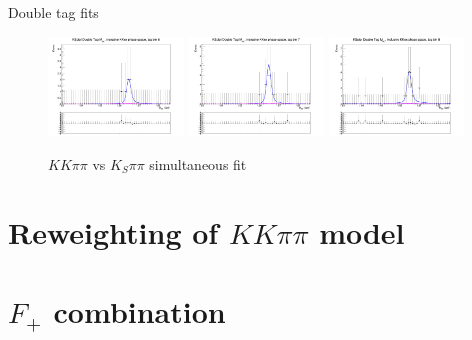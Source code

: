 \documentclass{beamer}
\begin{document}
\begin{frame}{Double tag fits}
\begin{figure}
    \includegraphics[width=0.32\textwidth, clip = true, trim = {0 11cm 0 0}]{Plots/DoubleTagYield_DoubleTag_SCMB_KKpipi_vs_KSpipi_SignalBin0_TagBin6.png}
    \includegraphics[width=0.32\textwidth, clip = true, trim = {0 11cm 0 0}]{Plots/DoubleTagYield_DoubleTag_SCMB_KKpipi_vs_KSpipi_SignalBin0_TagBin7.png}
    \includegraphics[width=0.32\textwidth, clip = true, trim = {0 11cm 0 0}]{Plots/DoubleTagYield_DoubleTag_SCMB_KKpipi_vs_KSpipi_SignalBin0_TagBin8.png}
    \caption{$KK\pi\pi$ vs $K_S\pi\pi$ simultaneous fit}
  \end{figure}
\end{frame}

\section{Reweighting of \texorpdfstring{$KK\pi\pi$}{KKpipi} model}

\section{\texorpdfstring{$F_+$}{F+} combination}
\end{document}
